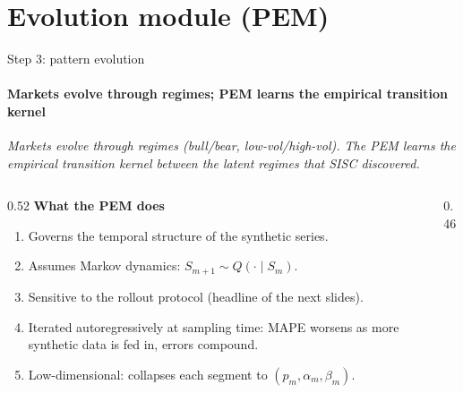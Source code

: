 \section{Evolution module (PEM)}

\begin{frame}{Step 3: pattern evolution}
\framesubtitle{Markets evolve through regimes; PEM learns the empirical transition kernel}
\vspace{-2mm}
{\scriptsize\itshape Markets evolve through regimes (bull/bear, low-vol/high-vol). The PEM learns the empirical transition kernel between the latent regimes that SISC discovered.}

\medskip
\begin{columns}[T,onlytextwidth]
\begin{column}{0.52\textwidth}\footnotesize
\textbf{What the PEM does}
\begin{enumerate}\setlength\itemsep{1pt}\setlength\topsep{0pt}
  \item Governs the \alert{temporal structure} of the synthetic series.
  \item Assumes Markov dynamics: $S_{m+1}\sim Q(\cdot\mid S_m)$.
  \item \alert{Sensitive to the rollout protocol} (headline of the next slides).
  \item Iterated \alert{autoregressively} at sampling time: MAPE worsens as more synthetic data is fed in, errors compound.
  \item \alert{Low-dimensional}: collapses each segment to $(p_m,\alpha_m,\beta_m)$.
\end{enumerate}
\end{column}
\begin{column}{0.46\textwidth}
\centering
{}
\end{column}
\end{columns}
\end{frame}
